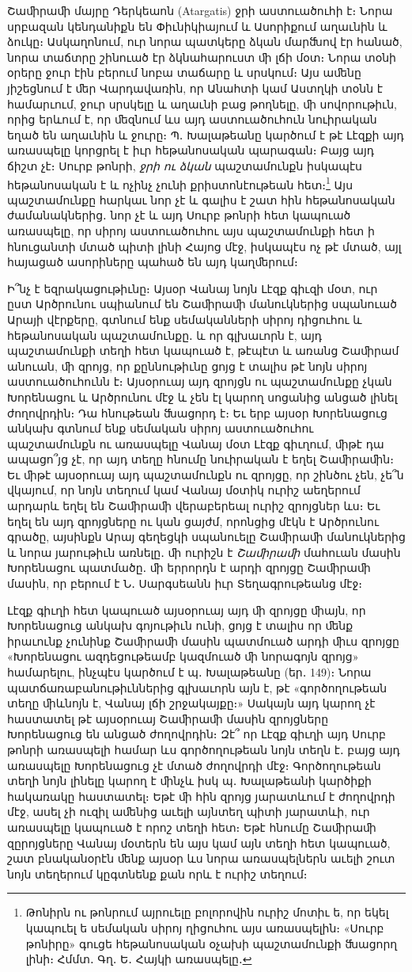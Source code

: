 \documentclass{article}
\begin{document}
{Շաﬕրաﬕ մայրը Դերկեաոն (Atargatis) ջրի աստուածուհի է։ Նորա սրբազան կենդանիքն են Փիւնիկիայում և Ասորիքում աղաւնին և ձուկը։ Ասկաղոնում, ուր նորա պատկերը ձկան մարﬓով էր հանած, նորա տաճտրը շինուած էր ձկնահարուստ ﬕ լճի մօտ։ Նորա տօնի օրերը ջուր էին բերում նոբա տաճարը և սրսկում։ Այս աﬔնը յիշեցնում է ﬔր Վարդավառին, որ Անահտի կամ Աստղկի տօնն է համարւում, ջուր սրսկելը և աղաւնի բաց թողնելը, ﬕ սովորութիւն, որից երևում է, որ ﬔզնում ևս այդ աստուածուհուն նուիրական եղած են աղաւնին և ջուրը։ Պ․ Խալաթեանը կարծում է թէ Լէզքի այդ առասպելը կորցրել է իւր հեթանոսական պարագան։ Բայց այդ ճիշտ չէ։ Սուրբ թոնրի, \emph{ջրի ու ձկան} պաշտամունքն իսկապէս հեթանոսական է և ոչինչ չունի քրիստոնէութեան հետ։\footnote{Թոնիրն ու թոնրում այրուելը բոլորովին ուրիշ մոտիւ ե, որ եկել կապուել ե սեմական սիրոյ ղիցուհու այս առասպելին։ «Սուրբ թոնիրը» գուցե հեթանոսական օչախի պաշտամունքի ﬓացորղ լինի։ Հմմտ․ Գղ․ Ե․ Հայկի առասպելը․} Այս պաշտամունքը հարկաւ նոր չէ և գալիս է շատ հին հեթանոսական ժամանակներից․ նոր չէ և այդ Սուրբ թոնրի հետ կապուած առասպելը, որ սիրոյ աստուածուհու այս պաշտամունքի հետ ի հնուցանտի մտած պիտի լինի Հայոց մէջ, իսկապէս ոչ թէ մտած, այլ հայացած ասորիները պահած են այդ կաղﬔրում։

Ի՞նչ է եզրակացութիւնը։ Այսօր Վանայ նոյն Լէզք գիւզի մօտ, ուր ըստ Արծրունու սպիանում են Շաﬕրաﬕ մանուկներից սպանուած Արայի վէրքերը, գտնում ենք սեմականների սիրոյ դիցուհու և հեթանոսական պաշտամունքը․ և որ գլխաւորն է, այդ պաշտամունքի տեղի հետ կապուած է, թէպէտ և առանց Շաﬕրամ անուան, ﬕ զրոյց, որ քըննութիւնը ցոյց է տալիս թէ նոյն սիրոյ աստուածուհունն է։ Այսօրուայ այդ զրոյցն ու պաշտամունքը չկան Խորենացու և Արծրունու մէջ և չեն էլ կարող սոցանից անցած լինել ժողովրդին։ Դա հնութեան ﬓացորդ է։ Եւ երբ այսօր Խորենացուց անկախ գտնում ենք սեմական սիրոյ աստուածուհու պաշտամունքն ու առասպելը Վանայ մօտ Լէզք գիւղում, ﬕթէ դա ապացո՞յց չէ, որ այդ տեղը հնումը նուիրական է եղել Շաﬕրաﬕն։ Եւ ﬕթէ այսօրուայ այդ պաշտամունքն ու զրոյցը, որ շինծու չեն, չե՞ն վկայում, որ նոյն տեղում կամ Վանայ մօտիկ ուրիշ աեղերում արդարև եղել են Շաﬕրաﬕ վերաբերեալ ուրիշ զրոյցներ ևս։ Եւ եղել են այդ զրոյցները ու կան ցայժմ, որոնցից մէկն է Արծրունու գրածը, այսինքն Արայ գեղեցկի սպանուելը Շաﬕրաﬕ մանուկներից և նորա յարութիւն առնելը․ ﬕ ուրիշն է \emph{Շաﬕրաﬕ} մահուան մասին Խորենացու պատմածը․ ﬕ երրորդն է արդի զրոյցը Շաﬕրաﬕ մասին, որ բերում է Ն․ Սարգսեանն իւր Տեղագրութեանց մէջ։

Լէզք գիւղի հետ կապուած այսօրուայ այդ ﬕ զրոյցը ﬕայն, որ Խորենացուց անկախ գոյութիւն ունի, ցոյց է տալիս որ ﬔնք իրաւունք չունինք Շաﬕրաﬕ մասին պատմուած արդի ﬕւս զրոյցը «Խորենացու ազդեցութեամբ կազմուած ﬕ նորագոյն զրոյց» համարելու, ինչպէս կարծում է պ․ Խալաթեանը (եր․ 149)։ Նորա պատճառաբանութիւններից գլխաւորն այն է, թէ «գործողութեան տեղը ﬕևնոյն է, Վանայ լճի շրջակայքը։» Սակայն այդ կարող չէ հաստատել թէ այսօրուայ Շաﬕրաﬕ մասին զրոյցները Խորենացուց են անցած ժողովրդին։ Զէ՞ որ Լէզք գիւղի այդ Սուրբ թոնրի առասպելի համար ևս գործողութեան նոյն տեղն է․ բայց այդ առասպելը Խորենացուց չէ մտած ժողովրդի մէջ։ Գործողութեան տեղի նոյն լինելը կարող է ﬕնչև իսկ պ․ Խալաթեանի կարծիքի հակառակը հաստատել։ Եթէ ﬕ հին զրոյց յարատևում է ժողովրդի մէջ, ասել չի ուզիլ աﬔնից աւելի այնտեղ պիտի յարատևի, ուր առասպելը կապուած է որոշ տեղի հետ։ Եթէ հնումը Շաﬕրաﬕ զըրոյցները Վանայ մօտերն են այս կամ այն տեղի հետ կապուած, շատ բնականօրէն ﬔնք այսօր ևս նորա առասպելներն աւելի շուտ նոյն տեղերում կըգտնենք քան որև է ուրիշ տեղում։

}
\end{document}
